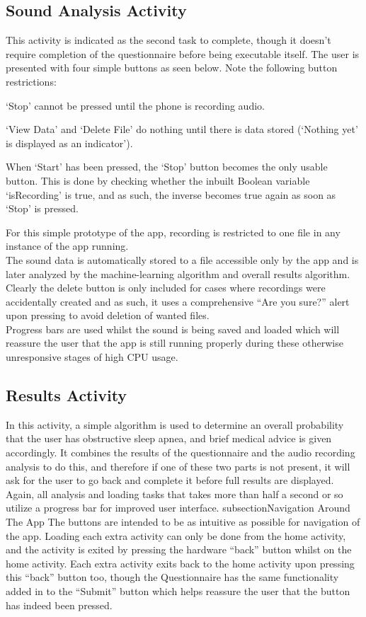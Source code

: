 \subsection{Sound Analysis Activity}
This activity is indicated as the second task to complete, though it doesn’t require completion of the questionnaire before being executable itself. The user is presented with four simple buttons as seen below. Note the following button restrictions:
\begin{itemise}
\item ‘Stop’ cannot be pressed until the phone is recording audio.
\item ‘View Data’ and ‘Delete File’ do nothing until there is data stored (‘Nothing yet’ is displayed as an indicator’).
\item When ‘Start’ has been pressed, the ‘Stop’ button becomes the only usable button. This is done by checking whether the inbuilt Boolean variable ‘isRecording’ is true, and as such, the inverse becomes true again as soon as ‘Stop’ is pressed.
\end{itemise}
For this simple prototype of the app, recording is restricted to one file in any instance of the app running.
\\ The sound data is automatically stored to a file accessible only by the app and is later analyzed by the machine-learning algorithm and overall results algorithm. Clearly the delete button is only included for cases where recordings were accidentally created and as such, it uses a comprehensive “Are you sure?” alert upon pressing to avoid deletion of wanted files.
\\Progress bars are used whilst the sound is being saved and loaded which will reassure the user that the app is still running properly during these otherwise unresponsive stages of high CPU usage. 
\subsection{Results Activity}
In this activity, a simple algorithm is used to determine an overall probability that the user has obstructive sleep apnea, and brief medical advice is given accordingly. It combines the results of the questionnaire and the audio recording analysis to do this, and therefore if one of these two parts is not present, it will ask for the user to go back and complete it before full results are displayed. Again, all analysis and loading tasks that takes more than half a second or so utilize a progress bar for improved user interface.
subsection{Navigation Around The App}
The buttons are intended to be as intuitive as possible for navigation of the app. Loading each extra activity can only be done from the home activity, and the activity is exited by pressing the hardware “back” button whilst on the home activity. Each extra activity exits back to the home activity upon pressing this “back” button too, though the Questionnaire has the same functionality added in to the “Submit” button which helps reassure the user that the button has indeed been pressed.
